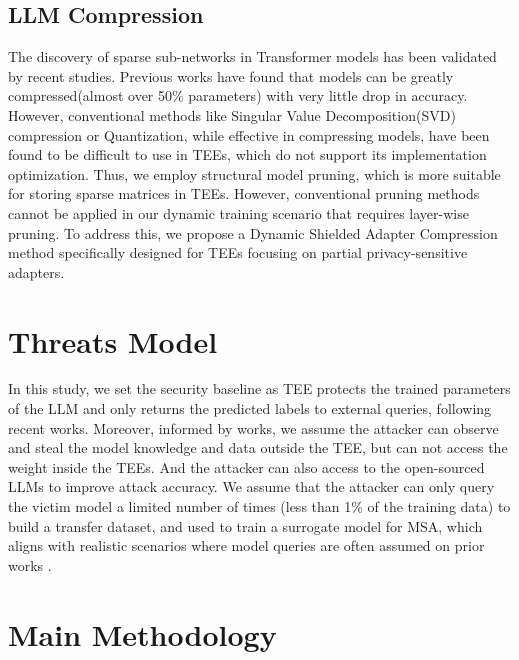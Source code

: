 \documentclass{article}
\begin{document}
\subsection{LLM Compression} 
The discovery of sparse sub-networks in Transformer models has been validated by recent studies\cite{ma2023llm_prune,zhang2023loraprune,lv2023lightformer,hoefler2021sparsity_prune}. Previous works have found that models can be greatly compressed(almost over 50\% parameters) with very little drop in accuracy. However, conventional methods like Singular Value Decomposition(SVD) compression\cite{wang2024svd} or Quantization\cite{radford2023robust}, while effective in compressing models, have been found to be difficult to use in TEEs, which do not support its implementation optimization. Thus, we employ structural model pruning, which is more suitable for storing sparse matrices in TEEs. However, conventional pruning methods\cite{zhang2023loraprune} cannot be applied in our dynamic training scenario that requires layer-wise pruning. To address this, we propose a Dynamic Shielded Adapter Compression method specifically designed for TEEs focusing on partial privacy-sensitive adapters.

\section{Threats Model}
\label{Threats}
In this study, we set the security baseline as TEE protects the trained parameters of the LLM and only returns the predicted labels to external queries, following recent works\cite{zhang2024no,AnonymousCoder2025Phantom}. Moreover, informed by works\cite{sun2023shadownet}, we assume the attacker can observe and steal the model knowledge and data outside the TEE, but can not access the weight inside the TEEs. And the attacker can also access to the open-sourced LLMs\cite{touvron2023llama,zhang2022opt} to improve attack accuracy. We assume that the attacker can only query the victim model a limited number of times (less than 1\% of the training data) to build a transfer dataset, and used to train a surrogate model for MSA, which aligns with realistic scenarios where model queries are often assumed on prior works \cite{zhang2024no,oliynyk2023know}.

\section{Main Methodology}
\label{method}
\end{document}
